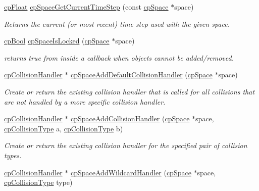 \begin{DoxyCompactItemize}
\hyperlink{group__basic_types_gac1ed65573e035bf892505768c852d8d3}{cp\+Float} \hyperlink{group__cp_space_gaec07cd16e997fb2765a4cd0209ce942f}{cp\+Space\+Get\+Current\+Time\+Step} (const \hyperlink{structcp_space}{cp\+Space} $\ast$space)
\begin{DoxyCompactList}\small\item\em Returns the current (or most recent) time step used with the given space. \end{DoxyCompactList}\item 
\hypertarget{group__cp_space_gae425962a45eea97567c0ddd8e8417711}{}\hyperlink{group__basic_types_gabc5e752c48f3449ca26ef413ecbd647e}{cp\+Bool} \hyperlink{group__cp_space_gae425962a45eea97567c0ddd8e8417711}{cp\+Space\+Is\+Locked} (\hyperlink{structcp_space}{cp\+Space} $\ast$space)\label{group__cp_space_gae425962a45eea97567c0ddd8e8417711}

\begin{DoxyCompactList}\small\item\em returns true from inside a callback when objects cannot be added/removed. \end{DoxyCompactList}\item 
\hypertarget{group__cp_space_gab3c3b915d1a4f2c0ab51da0e127145f8}{}\hyperlink{structcp_collision_handler}{cp\+Collision\+Handler} $\ast$ \hyperlink{group__cp_space_gab3c3b915d1a4f2c0ab51da0e127145f8}{cp\+Space\+Add\+Default\+Collision\+Handler} (\hyperlink{structcp_space}{cp\+Space} $\ast$space)\label{group__cp_space_gab3c3b915d1a4f2c0ab51da0e127145f8}

\begin{DoxyCompactList}\small\item\em Create or return the existing collision handler that is called for all collisions that are not handled by a more specific collision handler. \end{DoxyCompactList}\item 
\hyperlink{structcp_collision_handler}{cp\+Collision\+Handler} $\ast$ \hyperlink{group__cp_space_ga1a530112830b93f746a90284d18b39e7}{cp\+Space\+Add\+Collision\+Handler} (\hyperlink{structcp_space}{cp\+Space} $\ast$space, \hyperlink{group__basic_types_gae83e2f50965eb441e36ffff1e32e6d02}{cp\+Collision\+Type} a, \hyperlink{group__basic_types_gae83e2f50965eb441e36ffff1e32e6d02}{cp\+Collision\+Type} b)
\begin{DoxyCompactList}\small\item\em Create or return the existing collision handler for the specified pair of collision types. \end{DoxyCompactList}\item 
\hypertarget{group__cp_space_ga5ebf7560b11470507395d53b3ed8ec69}{}\hyperlink{structcp_collision_handler}{cp\+Collision\+Handler} $\ast$ \hyperlink{group__cp_space_ga5ebf7560b11470507395d53b3ed8ec69}{cp\+Space\+Add\+Wildcard\+Handler} (\hyperlink{structcp_space}{cp\+Space} $\ast$space, \hyperlink{group__basic_types_gae83e2f50965eb441e36ffff1e32e6d02}{cp\+Collision\+Type} type)\label{group__cp_space_ga5ebf7560b11470507395d53b3ed8ec69}


\end{DoxyCompactItemize}
